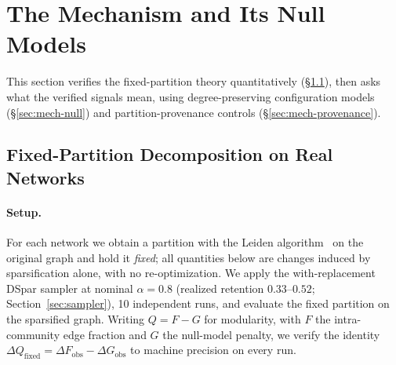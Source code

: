 \section{The Mechanism and Its Null Models}
\label{sec:mechanism}

This section verifies the fixed-partition theory quantitatively (\S\ref{sec:mech-verify}), then asks what the verified signals mean, using degree-preserving configuration models (\S\ref{sec:mech-null}) and partition-provenance controls (\S\ref{sec:mech-provenance}).

\subsection{Fixed-Partition Decomposition on Real Networks}
\label{sec:mech-verify}

\paragraph{Setup.}
For each network we obtain a partition with the Leiden algorithm~\cite{traag2019louvain} on the original graph and hold it \emph{fixed}; all quantities below are changes induced by sparsification alone, with no re-optimization.
We apply the with-replacement DSpar sampler at nominal $\alpha = 0.8$ (realized retention $0.33$--$0.52$; Section~\ref{sec:sampler}), 10 independent runs, and evaluate the fixed partition on the sparsified graph.
Writing $Q = F - G$ for modularity, with $F$ the intra-community edge fraction and $G$ the null-model penalty, we verify the identity $\Delta Q_{\mathrm{fixed}} = \Delta F_{\mathrm{obs}} - \Delta G_{\mathrm{obs}}$ to machine precision on every run.

